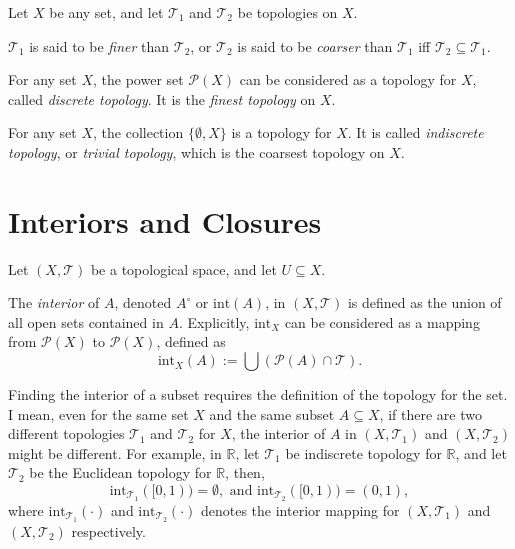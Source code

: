 \documentclass{report}
\begin{document}
\begin{definition}
	Let $X$ be any set, and let $\mathcal T_1$ and $\mathcal T_2$ be topologies on $X$.
	
	$\mathcal T_1$ is said to be \textit{finer} than $\mathcal T_2$, or $\mathcal T_2$ is said to be \textit{coarser} than $\mathcal T_1$ iff $\mathcal T_2 \subseteq \mathcal T_1$.
\end{definition}


\begin{example}
	For any set $X$, the power set $\mathcal P(X)$ can be considered as a topology for $X$, called \textit{discrete topology}. It is the \textit{finest topology} on $X$.
\end{example}

\begin{example}
	For any set $X$, the collection $\{\emptyset, X\}$ is a topology for $X$. It is called \textit{indiscrete topology}, or \textit{trivial topology}, which is the coarsest topology on $X$.
\end{example}


\section{Interiors and Closures}


\begin{definition}
	Let $(X, \mathcal T)$ be a topological space, and let $U \subseteq X$.
	
	The \textit{interior} of $A$, denoted $A^\circ$ or $\mathrm{int} (A)$, in $(X, \mathcal T)$ is defined as the union of all open sets contained in $A$. Explicitly, $\mathrm{int}_X$ can be considered as a mapping from $\mathcal P(X)$ to $\mathcal P(X)$, defined as
	$$
	\mathrm{int}_X(A) := \bigcup (\mathcal P(A) \cap \mathcal T).
	$$
\end{definition}


\begin{note}
	Finding the interior of a subset requires the definition of the topology for the set. I mean, even for the same set $X$ and the same subset $A \subseteq X$, if there are two different topologies $\mathcal T_1$ and $\mathcal T_2$ for $X$, the interior of $A$ in $(X, \mathcal T_1)$ and $(X, \mathcal T_2)$ might be different. For example, in $\mathbb R$, let $\mathcal T_1$ be indiscrete topology for $\mathbb R$, and let $\mathcal T_2$ be the Euclidean topology for $\mathbb R$, then,
	$$
	\mathrm{int}_{\mathcal T_1} ([0,1)) = \emptyset, \text{ and } \mathrm{int}_{\mathcal T_2}([0,1)) = (0,1),
	$$
	where $\mathrm{int}_{\mathcal T_1}(\cdot)$ and $\mathrm{int}_{\mathcal T_2}(\cdot)$ denotes the interior mapping for $(X, \mathcal T_1)$ and $(X, \mathcal T_2)$ respectively.
\end{note}
\end{document}
